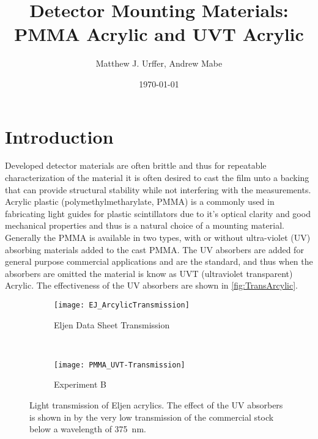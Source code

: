\documentclass[draftcls,onecolumn]{IEEEtran}
\begin{document}
\title{Detector Mounting Materials: PMMA Acrylic and UVT Acrylic}
\author{Matthew J. Urffer, Andrew Mabe}
\date{\today}
\maketitle

\tableofcontents
\listoffigures
\listoftables
\section{Introduction}
Developed detector materials are often brittle and thus for repeatable characterization of the material it is often desired to cast the film unto a backing that can provide structural stability while not interfering with the measurements.
Acrylic plastic (polymethylmetharylate, PMMA) is a commonly used in fabricating light guides for plastic scintillators due to it's optical clarity and good mechanical properties and thus is a natural choice of a mounting material.
Generally the PMMA is available in two types, with or without ultra-violet (UV) absorbing materials added to the cast PMMA.
The UV absorbers are added for general purpose commercial applications and are the standard, and thus when the absorbers are omitted the material is know as UVT (ultraviolet transparent) Acrylic.
The effectiveness of the UV absorbers are shown in \autoref{fig:TransArcylic}.
\begin{figure}
  \centering
 \begin{subfigure}[b]{0.45\textwidth}
    \centering
    \texttt{[image: EJ\_ArcylicTransmission]}
    \caption{Eljen Data Sheet Transmission}
  \end{subfigure}%
  ~
  \begin{subfigure}[b]{0.45\textwidth}
    \centering
    \texttt{[image: PMMA\_UVT-Transmission]}
    \caption{Experiment B}
  \end{subfigure}
  \caption[Light Transmission of Eljen Acrylics]{Light transmission of Eljen acrylics.  The effect of the UV absorbers is shown in by the very low transmission of the commercial stock below a wavelength of \SI{375}{\nm}.}
	\label{fig:TransArcylic}
\end{figure}	
\end{document}
